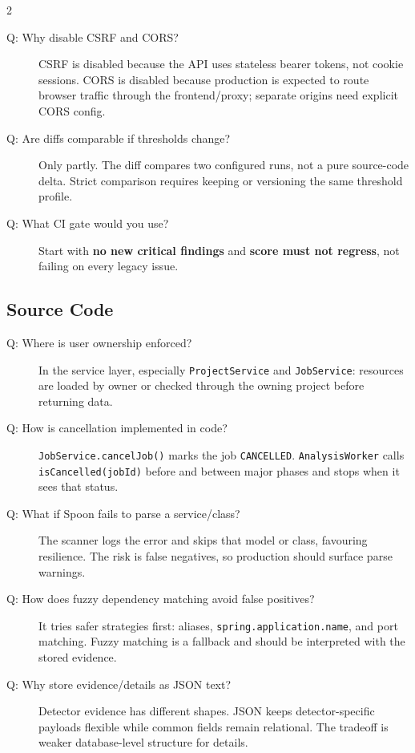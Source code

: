 \documentclass[10pt,a4paper]{article}
\begin{document}
\begin{multicols}{2}
\begin{description}
    \item[Q: Why disable CSRF and CORS?]
    CSRF is disabled because the API uses stateless bearer tokens, not cookie sessions. CORS is disabled because production is expected to route browser traffic through the frontend/proxy; separate origins need explicit CORS config.

    \item[Q: Are diffs comparable if thresholds change?]
    Only partly. The diff compares two configured runs, not a pure source-code delta. Strict comparison requires keeping or versioning the same threshold profile.

    \item[Q: What CI gate would you use?]
    Start with \textbf{no new critical findings} and \textbf{score must not regress}, not failing on every legacy issue.
\end{description}

\subsection{Source Code}

\begin{description}
    \item[Q: Where is user ownership enforced?]
    In the service layer, especially \texttt{ProjectService} and \texttt{JobService}: resources are loaded by owner or checked through the owning project before returning data.

    \item[Q: How is cancellation implemented in code?]
    \texttt{JobService.cancelJob()} marks the job \texttt{CANCELLED}. \texttt{AnalysisWorker} calls \texttt{isCancelled(jobId)} before and between major phases and stops when it sees that status.

    \item[Q: What if Spoon fails to parse a service/class?]
    The scanner logs the error and skips that model or class, favouring resilience. The risk is false negatives, so production should surface parse warnings.

    \item[Q: How does fuzzy dependency matching avoid false positives?]
    It tries safer strategies first: aliases, \texttt{spring.application.name}, and port matching. Fuzzy matching is a fallback and should be interpreted with the stored evidence.

    \item[Q: Why store evidence/details as JSON text?]
    Detector evidence has different shapes. JSON keeps detector-specific payloads flexible while common fields remain relational. The tradeoff is weaker database-level structure for details.


\end{description}
\end{multicols}
\end{document}
